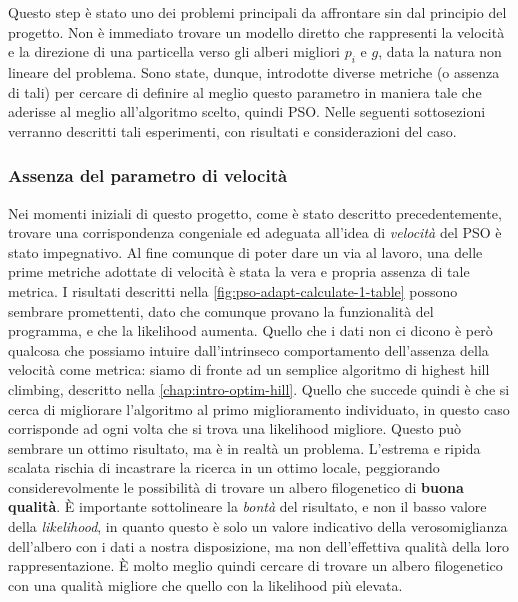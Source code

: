 Questo step è stato uno dei problemi principali da affrontare sin dal principio del progetto. Non è immediato trovare un modello diretto che rappresenti la velocità e la direzione di una particella verso gli alberi migliori $p_i$ e $g$, data la natura non lineare del problema. Sono state, dunque, introdotte diverse metriche (o assenza di tali) per cercare di definire al meglio questo parametro in maniera tale che aderisse al meglio all'algoritmo scelto, quindi PSO. Nelle seguenti sottosezioni verranno descritti tali esperimenti, con risultati e considerazioni del caso.

\subsubsection{Assenza del parametro di velocità}
\label{chap:pso-adapt-calculate-1}
Nei momenti iniziali di questo progetto, come è stato descritto precedentemente, trovare una corrispondenza congeniale ed adeguata all'idea di \textit{velocità} del PSO è stato impegnativo. Al fine comunque di poter dare un via al lavoro, una delle prime metriche adottate di velocità è stata la vera e propria assenza di tale metrica. I risultati descritti nella \autoref{fig:pso-adapt-calculate-1-table} possono sembrare promettenti, dato che comunque provano la funzionalità del programma, e che la likelihood aumenta. Quello che i dati non ci dicono è però qualcosa che possiamo intuire dall'intrinseco comportamento dell'assenza della velocità come metrica: siamo di fronte ad un semplice algoritmo di highest hill climbing, descritto nella \autoref{chap:intro-optim-hill}. Quello che succede quindi è che si cerca di migliorare l'algoritmo al primo miglioramento individuato, in questo caso corrisponde ad ogni volta che si trova una likelihood migliore. Questo può sembrare un ottimo risultato, ma è in realtà un problema. L'estrema e ripida scalata rischia di incastrare la ricerca in un ottimo locale, peggiorando considerevolmente le possibilità di trovare un albero filogenetico di \textbf{buona qualità}. È importante sottolineare la \textit{bontà} del risultato, e non il basso valore della \textit{likelihood}, in quanto questo è solo un valore indicativo della verosomiglianza dell'albero con i dati a nostra disposizione, ma non dell'effettiva qualità della loro rappresentazione. È molto meglio quindi cercare di trovare un albero filogenetico con una qualità migliore che quello con la likelihood più elevata.


